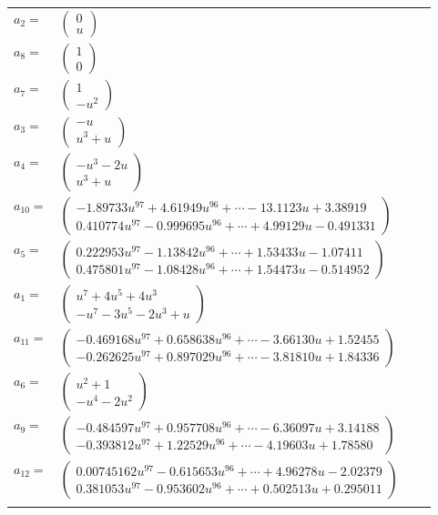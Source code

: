 \documentclass[1p]{elsarticle_modified}
\theoremstyle{definition}
\begin{document}
\begin{tabular}{m{7pt} m{180pt} m{7pt} m{180pt} }
\flushright $a_{2}=$&$\begin{pmatrix}0\\u\end{pmatrix}$ \\
\flushright $a_{8}=$&$\begin{pmatrix}1\\0\end{pmatrix}$ \\
\flushright $a_{7}=$&$\begin{pmatrix}1\\- u^2\end{pmatrix}$ \\
\flushright $a_{3}=$&$\begin{pmatrix}- u\\u^3+u\end{pmatrix}$ \\
\flushright $a_{4}=$&$\begin{pmatrix}- u^3-2 u\\u^3+u\end{pmatrix}$ \\
\flushright $a_{10}=$&$\begin{pmatrix}-1.89733 u^{97}+4.61949 u^{96}+\cdots-13.1123 u+3.38919\\0.410774 u^{97}-0.999695 u^{96}+\cdots+4.99129 u-0.491331\end{pmatrix}$ \\
\flushright $a_{5}=$&$\begin{pmatrix}0.222953 u^{97}-1.13842 u^{96}+\cdots+1.53433 u-1.07411\\0.475801 u^{97}-1.08428 u^{96}+\cdots+1.54473 u-0.514952\end{pmatrix}$ \\
\flushright $a_{1}=$&$\begin{pmatrix}u^7+4 u^5+4 u^3\\- u^7-3 u^5-2 u^3+u\end{pmatrix}$ \\
\flushright $a_{11}=$&$\begin{pmatrix}-0.469168 u^{97}+0.658638 u^{96}+\cdots-3.66130 u+1.52455\\-0.262625 u^{97}+0.897029 u^{96}+\cdots-3.81810 u+1.84336\end{pmatrix}$ \\
\flushright $a_{6}=$&$\begin{pmatrix}u^2+1\\- u^4-2 u^2\end{pmatrix}$ \\
\flushright $a_{9}=$&$\begin{pmatrix}-0.484597 u^{97}+0.957708 u^{96}+\cdots-6.36097 u+3.14188\\-0.393812 u^{97}+1.22529 u^{96}+\cdots-4.19603 u+1.78580\end{pmatrix}$ \\
\flushright $a_{12}=$&$\begin{pmatrix}0.00745162 u^{97}-0.615653 u^{96}+\cdots+4.96278 u-2.02379\\0.381053 u^{97}-0.953602 u^{96}+\cdots+0.502513 u+0.295011\end{pmatrix}$\\&\end{tabular}
\end{document}
